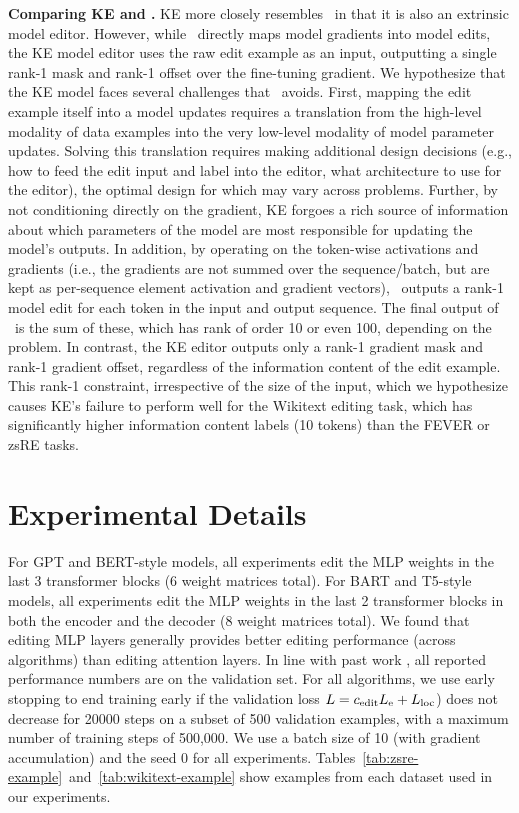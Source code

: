\textbf{Comparing KE and \name\@.} KE more closely resembles \name~in that it is also an extrinsic model editor. However, while \name~directly maps model gradients into model edits, the KE model editor uses the raw edit example as an input, outputting a single rank-1 mask and rank-1 offset over the fine-tuning gradient. We hypothesize that the KE model faces several challenges that \name~avoids. First, mapping the edit example itself into a model updates requires a translation from the high-level modality of data examples into the very low-level modality of model parameter updates. Solving this translation requires making additional design decisions (e.g., how to feed the edit input and label into the editor, what architecture to use for the editor), the optimal design for which may vary across problems. Further, by not conditioning directly on the gradient, KE forgoes a rich source of information about which parameters of the model are most responsible for updating the model's outputs. In addition, by operating on the token-wise activations and gradients (i.e., the gradients are not summed over the sequence/batch, but are kept as per-sequence element activation and gradient vectors), \name~outputs a rank-1 model edit for each token in the input and output sequence. The final output of \name~is the sum of these, which has rank of order 10 or even 100, depending on the problem. In contrast, the KE editor outputs only a rank-1 gradient mask and rank-1 gradient offset, regardless of the information content of the edit example. This rank-1 constraint, irrespective of the size of the input, which we hypothesize causes KE's failure to perform well for the Wikitext editing task, which has significantly higher information content labels (10 tokens) than the FEVER or zsRE tasks.

\section{Experimental Details}
\label{sec:details}
\makefeverzsretables

For GPT and BERT-style models, all experiments edit the MLP weights in the last 3 transformer blocks (6 weight matrices total). For BART and T5-style models, all experiments edit the MLP weights in the last 2 transformer blocks in both the encoder and the decoder (8 weight matrices total). We found that editing MLP layers generally provides better editing performance (across algorithms) than editing attention layers. In line with past work \citep{Cao2021EditingFK}, all reported performance numbers are on the validation set. For all algorithms, we use early stopping to end training early if the validation loss $L = c_\text{edit}L_\text{e} + L_\text{loc}$) does not decrease for 20000 steps on a subset of 500 validation examples, with a maximum number of training steps of 500,000. We use a batch size of 10 (with gradient accumulation) and the seed 0 for all experiments. Tables~\ref{tab:zsre-example}~and~\ref{tab:wikitext-example} show examples from each dataset used in our experiments.

